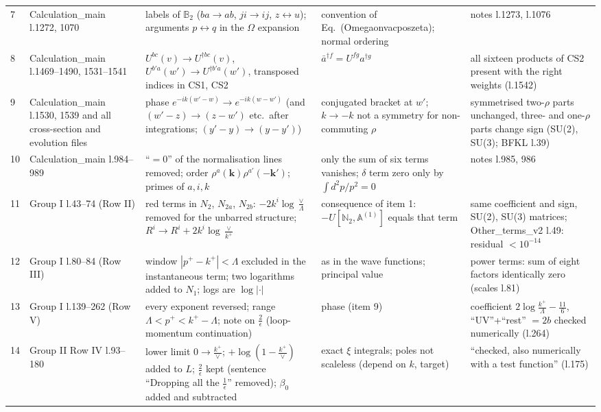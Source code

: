 \documentclass[10pt]{article}
\def\mf#1{\mathbb{#1}}
\begin{document}
{\begin{longtable}{@{}p{0.4cm}p{2.7cm}p{5.0cm}p{4.0cm}p{4.0cm}@{}}
7 & Calculation\_main l.1272, 1070 & labels of $\mf{B}_{2}$ ($ba\to ab$, $ji\to ij$, $z\leftrightarrow u$); arguments $p\leftrightarrow q$ in the $\Omega$ expansion & convention of Eq.~(Omegaonvacposzeta); normal ordering & notes l.1273, l.1076\\
8 & Calculation\_main l.1469--1490, 1531--1541 & $U^{bc}(v)\to U^{\dagger bc}(v)$, $U^{b'a}(w')\to U^{\dagger b'a}(w')$, transposed indices in CS1, CS2 & $\bar a^{\dagger f}=U^{fg}a^{\dagger g}$ & all sixteen products of CS2 present with the right weights (l.1542)\\
9 & Calculation\_main l.1530, 1539 and all cross-section and evolution files & phase $e^{-ik(w'-w)}\to e^{-ik(w-w')}$ (and $(w'-z)\to(z-w')$ etc.\ after integrations; $(y'-y)\to(y-y')$) & conjugated bracket at $w'$; $k\to-k$ not a symmetry for non-commuting $\rho$ & symmetrised two-$\rho$ parts unchanged, three- and one-$\rho$ parts change sign (SU(2), SU(3); BFKL l.39)\\
10 & Calculation\_main l.984--989 & ``$=0$'' of the normalisation lines removed; order $\rho^{a}(\mathbf{k})\rho^{a'}(-\mathbf{k}')$; primes of $a,i,k$ & only the sum of six terms vanishes; $\delta$ term zero only by $\int d^{2}p/p^{2}=0$ & notes l.985, 986\\
11 & Group I l.43--74 (Row II) & red terms in $N_{2}$, $N_{2a}$, $N_{2b}$: $-2k^{i}\log\frac{\vee}{\Lambda}$ removed for the unbarred structure; $R^{i}\to R^{i}+2k^{i}\log\frac{\vee}{k^{+}}$ & consequence of item 1: $-U[\mf N_2,\mf A^{(1)}]$ equals that term & same coefficient and sign, SU(2), SU(3) matrices; Other\_terms\_v2 l.49: residual $<10^{-14}$\\
12 & Group I l.80--84 (Row III) & window $|p^{+}-k^{+}|<\Lambda$ excluded in the instantaneous term; two logarithms added to $N_{1}$; logs are $\log|\cdot|$ & as in the wave functions; principal value & power terms: sum of eight factors identically zero (scales l.81)\\
13 & Group I l.139--262 (Row V) & every exponent reversed; range $\Lambda<p^{+}<k^{+}-\Lambda$; note on $\frac{2}{\epsilon}$ (loop-momentum continuation) & phase (item 9) & coefficient $2\log\frac{k^{+}}{\Lambda}-\frac{11}{6}$, ``UV''+``rest'' $=2b$ checked numerically (l.264)\\
14 & Group II Row IV l.93--180 & lower limit $0\to\frac{k^{+}}{\vee}$; $+\log(1-\frac{k^{+}}{\vee})$ added to $L$; $\frac{2}{\epsilon}$ kept (sentence ``Dropping all the $\frac1\epsilon$'' removed); $\beta_{0}$ added and subtracted & exact $\xi$ integrals; poles not scaleless (depend on $k$, target) & ``checked, also numerically with a test function'' (l.175)\\

\end{longtable}}
\end{document}
